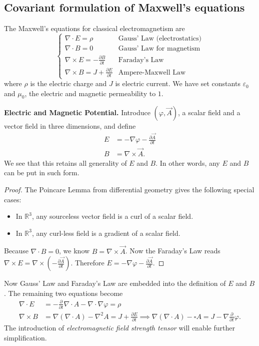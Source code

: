\subsection{Covariant formulation of Maxwell's equations}

The Maxwell's equations for classical electromagnetism are
\begin{equation*}
	\begin{cases}
		\nabla \cdot E = \rho & \text{Gauss' Law (electrostatics)}\\
		\nabla  \cdot B = 0 & \text{Gauss' Law for magnetism}\\
		\nabla  \times E = - \frac{\partial B}{\partial t} & \text{Faraday's Law}\\
		\nabla  \times  B = J + \frac{\partial E}{\partial t}  & \text{Ampere-Maxwell Law}
	\end{cases}
\end{equation*}
where $\rho$ is the electric charge and $J$ is electric current. We have set constants $\varepsilon_0$ and $\mu_0$, the electric and magnetic permeability to $1$.

\textbf{Electric and Magnetic Potential.} Introduce  $(\varphi, \vec{A} )$, a scalar field and a vector field in three dimensions, and define
\begin{align*}
	E &=  - \nabla \varphi - \frac{\partial \vec{A} }{\partial t}  \\
	B &= \nabla \times \vec{A} 
.\end{align*}
We see that this retains all generality of $E$ and $B$. In other words, any $E$ and $B$ can be put in such form.
\begin{proof}
	The Poincare Lemma from differential geometry gives the following special cases:
	\begin{itemize}
		\item In $\mathbb{R}^3$, any sourceless vector field is a curl of a scalar field.
		\item In $\mathbb{R}^3$, any curl-less field is a gradient of a scalar field.
	\end{itemize}
	Because $\nabla  \cdot B = 0$, we know  $B = \nabla  \times \vec{A} $. Now the Faraday's Law reads $\nabla \times E = \nabla \times (- \frac{\partial \vec{A} }{\partial t} )$. Therefore $E = - \nabla  \varphi - \frac{\partial \vec{A} }{\partial t} $.
\end{proof}

Now Gauss' Law and Faraday's Law are embedded into the definition of $E$ and $B$. The remaining two equations become
\begin{align*}
	\nabla \cdot E &= - \frac{\partial }{\partial t}  \nabla  \cdot A - \nabla  \cdot  \nabla \varphi = \rho\\
	\nabla \times B &= \nabla (\nabla \cdot A) - \nabla ^2 A = J + \frac{\partial E}{\partial t} \implies \nabla (\nabla  \cdot A) - \square A = J - \nabla  \frac{\partial }{\partial t} \varphi
.\end{align*}
The introduction of \textit{electromagnetic field strength tensor} will enable further simplification.

